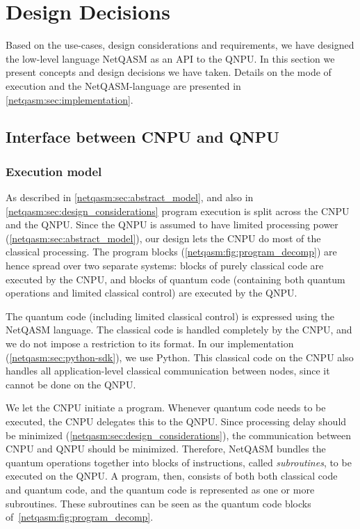 \section{Design Decisions}
\label{netqasm:sec:design_decisions}

Based on the use-cases, design considerations and requirements, we have designed the low-level language \ac{NetQASM} as an API to the \ac{QNPU}.
In this section we present concepts and design decisions we have taken.
Details on the mode of execution and the \ac{NetQASM}-language are presented in \cref{netqasm:sec:implementation}.

\subsection{Interface between \ac{CNPU} and QNPU}
\label{netqasm:sec:design_decisions_interface}

\subsubsection{Execution model}
As described in \cref{netqasm:sec:abstract_model}, and also in \cref{netqasm:sec:design_considerations} program execution is split across the \ac{CNPU} and the \ac{QNPU}.
Since the \ac{QNPU} is assumed to have limited processing power (\cref{netqasm:sec:abstract_model}), our design lets the \ac{CNPU} do most of the classical processing.
The program blocks (\cref{netqasm:fig:program_decomp}) are hence spread over two separate systems: blocks of purely classical code are executed by the \ac{CNPU}, and blocks of quantum code (containing both quantum operations and limited classical control) are executed by the \ac{QNPU}.

The quantum code (including limited classical control) is expressed using the \ac{NetQASM} language.
The classical code is handled completely by the \ac{CNPU}, and we do not impose a restriction to its format.
In our implementation (\cref{netqasm:sec:python-sdk}), we use Python.
This classical code on the \ac{CNPU} also handles all application-level classical communication between nodes, since it cannot be done on the \ac{QNPU}.

We let the \ac{CNPU} initiate a program.
Whenever quantum code needs to be executed, the \ac{CNPU} delegates this to the \ac{QNPU}.
Since processing delay should be minimized (\cref{netqasm:sec:design_considerations}), the communication between \ac{CNPU} and \ac{QNPU} should be minimized.
Therefore, \ac{NetQASM} bundles the quantum operations together into blocks of instructions, called \textit{subroutines}, to be executed on the \ac{QNPU}.
A program, then, consists of both both classical code and quantum code, and the quantum code is represented as one or more subroutines.
These subroutines can be seen as the quantum code blocks of~\cref{netqasm:fig:program_decomp}.

